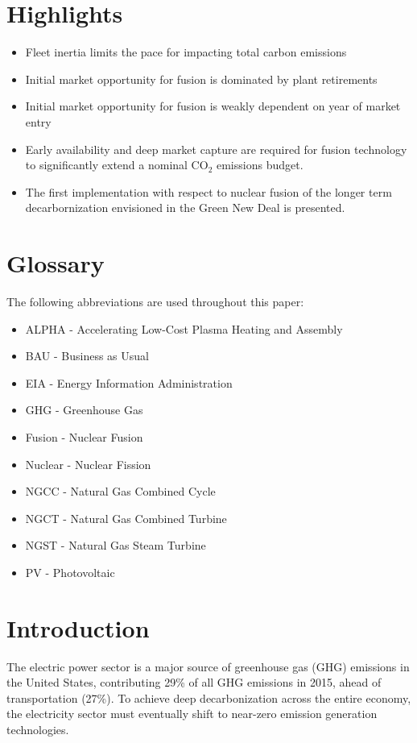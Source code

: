 \documentclass[review]{elsarticle}
\begin{document}
\section*{Highlights}
\begin{itemize}
\item Fleet inertia limits the pace for impacting total carbon emissions
\item Initial market opportunity for fusion is dominated by plant retirements 
\item Initial market opportunity for fusion is weakly dependent on year of market entry
\item Early availability and deep market capture  are required for fusion technology to significantly extend a nominal CO$_2$ emissions budget. 
\item The first implementation with respect to nuclear fusion of the longer term decarbornization envisioned in the Green New Deal is presented. 
\end{itemize}

\section*{Glossary}
The following abbreviations are used throughout this paper:

\begin{itemize}
\item ALPHA - Accelerating Low-Cost Plasma Heating and Assembly
\item BAU - Business as Usual
\item EIA - Energy Information Administration 
\item GHG - Greenhouse Gas 
\item Fusion - Nuclear Fusion 
\item Nuclear - Nuclear Fission
\item NGCC - Natural Gas Combined Cycle
\item NGCT - Natural Gas Combined Turbine
\item NGST - Natural Gas Steam Turbine
\item PV - Photovoltaic
\end{itemize}

\section{Introduction}
The electric power sector is a major source of greenhouse gas (GHG) emissions in the United States, contributing 29\% of all GHG emissions in 2015, ahead of transportation (27\%)\citep{EPA2017}. To achieve deep decarbonization across the entire economy, the electricity sector must eventually shift to near-zero emission generation technologies.
\end{document}

